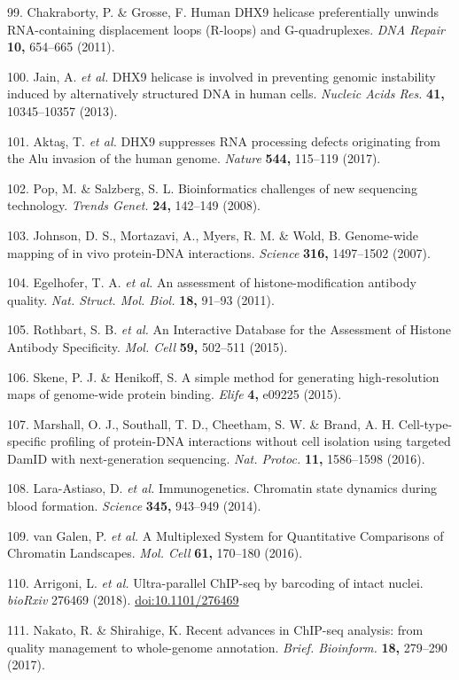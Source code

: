 \documentclass[11pt,twoside]{MPIthesis}
\theoremstyle{definition}
\theoremstyle{definition}
\theoremstyle{definition}
\theoremstyle{remark}
\begin{document}
99. Chakraborty, P. \& Grosse, F. Human DHX9 helicase preferentially
unwinds RNA-containing displacement loops (R-loops) and G-quadruplexes.
\emph{DNA Repair} \textbf{10,} 654--665 (2011).

100. Jain, A. \emph{et al.} DHX9 helicase is involved in preventing
genomic instability induced by alternatively structured DNA in human
cells. \emph{Nucleic Acids Res.} \textbf{41,} 10345--10357 (2013).

101. Aktaş, T. \emph{et al.} DHX9 suppresses RNA processing defects
originating from the Alu invasion of the human genome. \emph{Nature}
\textbf{544,} 115--119 (2017).

102. Pop, M. \& Salzberg, S. L. Bioinformatics challenges of new
sequencing technology. \emph{Trends Genet.} \textbf{24,} 142--149
(2008).

103. Johnson, D. S., Mortazavi, A., Myers, R. M. \& Wold, B. Genome-wide
mapping of in vivo protein-DNA interactions. \emph{Science}
\textbf{316,} 1497--1502 (2007).

104. Egelhofer, T. A. \emph{et al.} An assessment of
histone-modification antibody quality. \emph{Nat. Struct. Mol. Biol.}
\textbf{18,} 91--93 (2011).

105. Rothbart, S. B. \emph{et al.} An Interactive Database for the
Assessment of Histone Antibody Specificity. \emph{Mol. Cell}
\textbf{59,} 502--511 (2015).

106. Skene, P. J. \& Henikoff, S. A simple method for generating
high-resolution maps of genome-wide protein binding. \emph{Elife}
\textbf{4,} e09225 (2015).

107. Marshall, O. J., Southall, T. D., Cheetham, S. W. \& Brand, A. H.
Cell-type-specific profiling of protein-DNA interactions without cell
isolation using targeted DamID with next-generation sequencing.
\emph{Nat. Protoc.} \textbf{11,} 1586--1598 (2016).

108. Lara-Astiaso, D. \emph{et al.} Immunogenetics. Chromatin state
dynamics during blood formation. \emph{Science} \textbf{345,} 943--949
(2014).

109. van Galen, P. \emph{et al.} A Multiplexed System for Quantitative
Comparisons of Chromatin Landscapes. \emph{Mol. Cell} \textbf{61,}
170--180 (2016).

110. Arrigoni, L. \emph{et al.} Ultra-parallel ChIP-seq by barcoding of
intact nuclei. \emph{bioRxiv} 276469 (2018). \url{doi:10.1101/276469}

111. Nakato, R. \& Shirahige, K. Recent advances in ChIP-seq analysis:
from quality management to whole-genome annotation. \emph{Brief.
Bioinform.} \textbf{18,} 279--290 (2017).
\end{document}

